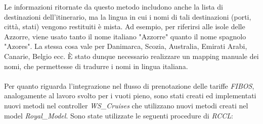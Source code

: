 Le informazioni ritornate da questo metodo includono anche la lista di destinazioni dell'itinerario, ma la lingua in cui i nomi di tali destinazioni (porti, città, stati) vengono restituiti è mista. Ad esempio, per riferirsi alle isole delle Azzorre, viene usato tanto il nome italiano "Azzorre" quanto il nome spagnolo "Azores". La stessa cosa vale per Danimarca, Scozia, Australia, Emirati Arabi, Canarie, Belgio ecc. È stato dunque necessario realizzare un mapping manuale dei nomi, che permettesse di tradurre i nomi in lingua italiana.\\ \\
Per quanto riguarda l'integrazione nel flusso di prenotazione delle tariffe \textit{FIBOS}, analogamente al lavoro svolto per i vuoti pieno, sono stati creati ed implementati nuovi metodi nel controller \textit{WS\_Cruises} che utilizzano nuovi metodi creati nel model \textit{Royal\_Model}. Sono state utilizzate le seguenti procedure di \textit{RCCL}:

